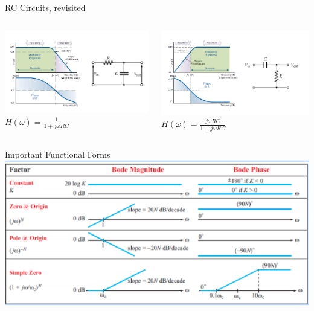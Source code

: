     \begin{frame}{RC Circuits, revisited}
        \begin{columns}
            \begin{column}{0.5\textwidth}
                \includegraphics[scale=0.75]{./images/Rc-circuits-revisited-1.png}\\
                $H(\omega) = \frac{1}{1 + j\omega RC}$
            \end{column}
            \begin{column}{0.5\textwidth}
                \includegraphics[scale=0.75]{./images/rc-circuits-revisited-2.png}\\
                $H(\omega) = \frac{j\omega RC}{1 + j\omega RC}$
            \end{column}
            
        \end{columns}
    \end{frame}
    \begin{frame}{Important Functional Forms}
        \includegraphics[scale=0.75]{./images/important-functional-forms-1.png}
    \end{frame}
